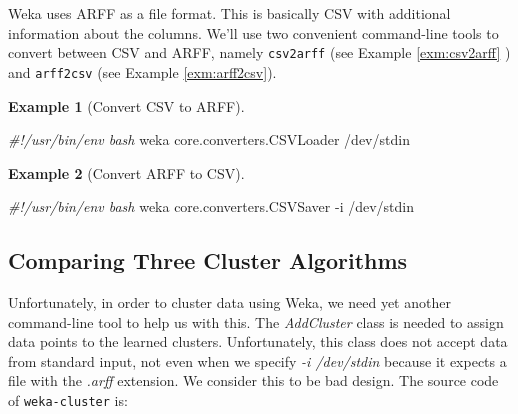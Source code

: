 \documentclass[
]{book}
\newenvironment{Shaded}{\begin{snugshade}}{\end{snugshade}}
\newcommand{\CommentTok}[1]{\textcolor[rgb]{0.56,0.35,0.01}{\textit{#1}}}
\newcommand{\ExtensionTok}[1]{#1}
\newcommand{\NormalTok}[1]{#1}
\theoremstyle{definition}
\theoremstyle{definition}
\newtheorem{example}{Example}[chapter]
\theoremstyle{definition}
\theoremstyle{remark}
\begin{document}
Weka uses ARFF as a file format. This is basically CSV with additional information about the columns. We'll use two convenient command-line tools to convert between CSV and ARFF, namely \texttt{csv2arff} (see Example \ref{exm:csv2arff} ) and \texttt{arff2csv} (see Example \ref{exm:arff2csv}).

\begin{example}[Convert CSV to ARFF]
\protect\hypertarget{exm:csv2arff}{}{\label{exm:csv2arff} {} }
\end{example}

\begin{Shaded}
\begin{Highlighting}[]
\CommentTok{#!/usr/bin/env bash}
\ExtensionTok{weka}\NormalTok{ core.converters.CSVLoader /dev/stdin}
\end{Highlighting}
\end{Shaded}

\begin{example}[Convert ARFF to CSV]
\protect\hypertarget{exm:arff2csv}{}{\label{exm:arff2csv} {} }
\end{example}

\begin{Shaded}
\begin{Highlighting}[]
\CommentTok{#!/usr/bin/env bash}
\ExtensionTok{weka}\NormalTok{ core.converters.CSVSaver -i /dev/stdin}
\end{Highlighting}
\end{Shaded}

\hypertarget{comparing-three-cluster-algorithms}{%
\subsection{Comparing Three Cluster Algorithms}\label{comparing-three-cluster-algorithms}}

Unfortunately, in order to cluster data using Weka, we need yet another command-line tool to help us with this. The \emph{AddCluster} class is needed to assign data points to the learned clusters. Unfortunately, this class does not accept data from standard input, not even when we specify \emph{-i /dev/stdin} because it expects a file with the \emph{.arff} extension. We consider this to be bad design. The source code of \texttt{weka-cluster} is:
\end{document}
